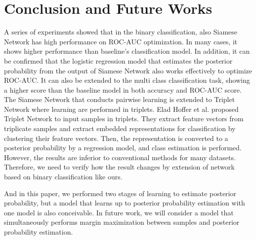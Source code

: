 \documentclass[twocolumn,10pt]{article}
\begin{document}
\section{Conclusion and Future Works}
\thispagestyle{empty}

A series of experiments showed that in the binary classification, also Siamese Network has high performance on ROC-AUC optimization.
In many cases, it shows higher performance than baseline's classification model.
In addition, it can be confirmed that the logistic regression model that estimates the posterior probability from the output of Siamese Network also works effectively to optimize ROC-AUC.
It can also be extended to the multi class classification task, showing a higher score than the baseline model in both accuracy and ROC-AUC score.
The Siamese Network that conducts pairwise learning is extended to Triplet Network where learning are performed in triplets.
Elad Hoffer et al. \cite{triplet} proposed Triplet Network to input samples in triplets.
They extract feature vectors from triplicate samples and extract embedded representations for classification by clustering their feature vectors.
Then, the representation is converted to a posterior probability by a regression model, and class estimation is performed.
However, the results are inferior to conventional methods for many datasets.
Therefore, we need to verify how the result changes by extension of network based on binary classification like ours.

And in this paper, we performed two stages of learning to estimate posterior probability, but a model that learns up to posterior probability estimation with one model is also conceivable.
In future work, we will consider a model that simultaneously performs margin maximization between samples and posterior probability estimation.
\end{document}
